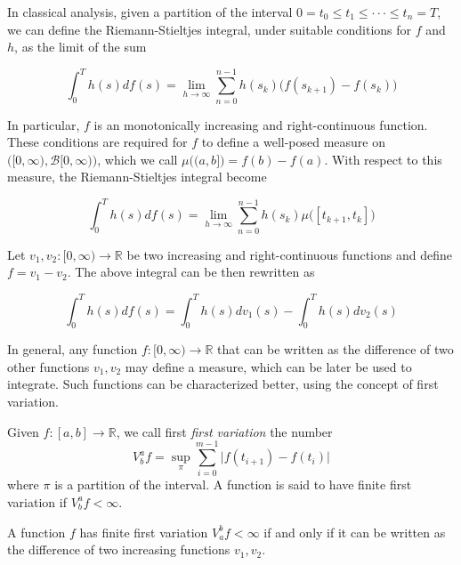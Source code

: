 In classical analysis, given a partition of the interval $0 = t_0 \leq t_1 \leq \cdot\cdot\cdot \leq t_n = T$, we can define the Riemann-Stieltjes integral, under suitable conditions for $f$ and $h$, as the limit of the sum 

\begin{equation*}
    \int_0^T h(s) df(s) = \lim_{h \to \infty} \sum_{n=0}^{n-1} h(s_k)\Big( f(s_{k+1})-f(s_{k})\Big)
\end{equation*}

In particular, $f$ is an monotonically increasing and right-continuous function. These conditions are required for $f$ to define a well-posed measure on $\Big([0,\infty), \mathcal{B}[0,\infty) \Big)$, which we call $\mu\big((a,b]\big) = f(b)-f(a)$. With respect to this measure, the Riemann-Stieltjes integral become

\begin{equation*}
    \int_0^T h(s) df(s) = \lim_{h \to \infty} \sum_{n=0}^{n-1} h(s_k)\mu\big( [t_{k+1},t_k]\big)
\end{equation*}

Let $v_1,v_2 : [0,\infty) \to \mathbb{R}$ be two increasing and right-continuous functions and define $f = v_1-v_2$. The above integral can be then rewritten as 

\begin{equation*}
    \int_0^T h(s) df(s) = \int_0^T h(s) dv_1(s) - \int_0^T h(s) dv_2(s)
\end{equation*}

In general, any function $f : [0,\infty) \to \mathbb{R}$ that can be written as the difference of two other functions $v_1,v_2$ may define a measure, which can be later be used to integrate. Such functions can be characterized better, using the concept of first variation. 

\begin{definition}
    Given $f : [a,b] \to \mathbb{R}$, we call first \textit{first variation} the number
    \begin{equation*}
        V^a_b f = \sup_{\pi} \sum_{i=0}^{m-1} \Big\vert f(t_{i+1}) - f(t_i) \Big\vert
    \end{equation*}
    where $\pi$ is a partition of the interval. A function is said to have finite first variation if $V^a_b f < \infty$. 
\end{definition}

\begin{proposition}
    A function $f$ has finite first variation $V_a^b f < \infty$ if and only if it can be written as the difference of two increasing functions $v_1,v_2$.
\end{proposition}

